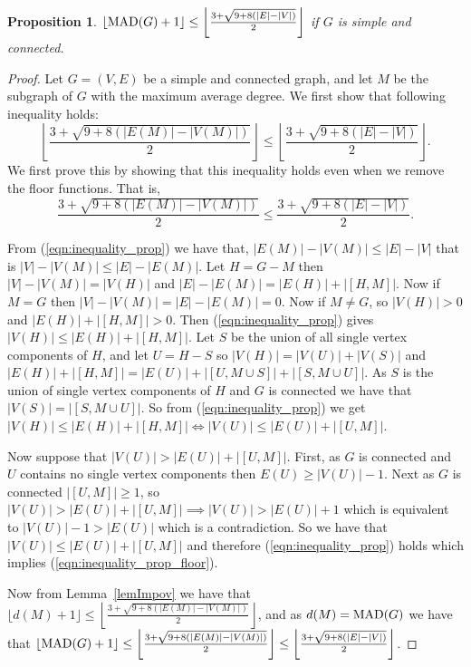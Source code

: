 \documentclass{article}
\newcommand{\MAD}{\ensuremath{\text{\textit{MAD}}}}
\newtheorem{proposition}{Proposition}
\begin{document}
\begin{proposition}\label{improv3}
    $\lfloor \MAD(G)+1 \rfloor \leq \left\lfloor \frac{3+\sqrt{9+8(|E|-|V|)}}{2} \right\rfloor$ if $G$ is simple and connected.
\end{proposition}

\begin{proof}
    Let $G = (V,E)$ be a simple and connected graph, and let $M$ be the subgraph of $G$ with the maximum average degree.
    We first show that following inequality holds:
    \begin{equation}\label{eqn:inequality_prop_floor}
        \left\lfloor \frac{3+\sqrt{9+8(|E(M)|-|V(M)|)}}{2} \right\rfloor \leq \left\lfloor \frac{3+\sqrt{9+8(|E|-|V|)}}{2} \right\rfloor.
    \end{equation}
    We first prove this by showing that this inequality holds even when we remove the floor functions. That is, 
    \begin{equation}\label{eqn:inequality_prop}
    \frac{3+\sqrt{9+8(|E(M)|-|V(M)|)}}{2} \leq \frac{3+\sqrt{9+8(|E|-|V|)}}{2}.
    \end{equation}
    
    From (\ref{eqn:inequality_prop}) we have that, $|E(M)|-|V(M)| \leq |E|-|V|$ that is $|V|-|V(M)| \leq |E|-|E(M)|$. 
    Let $H = G-M$ then $|V|-|V(M)| = |V(H)|$ and $|E|-|E(M)| = |E(H)| + |[H,M]|$. Now if $M = G$ then $|V|-|V(M)| = |E|-|E(M)| = 0$. Now if $M \neq G$, so $|V(H)| > 0$ and  $|E(H)| + |[H,M]| > 0$. Then (\ref{eqn:inequality_prop}) gives $|V(H)| \leq |E(H)| + |[H,M]|$. Let $S$ be the union of all single vertex components of $H$, and let $U = H - S$ so $|V(H)| = |V(U)| + |V(S)|$ and $|E(H)| + |[H,M]| = |E(U)| + |[U,M \cup S]| + |[S,M \cup U]|$. As $S$ is the union of single vertex components of $H$ and $G$ is connected we have that $|V(S)| = |[S,M \cup U]|$.
    So from (\ref{eqn:inequality_prop}) we get $|V(H)| \leq |E(H)| + |[H,M]| \iff |V(U)| \leq |E(U)| + |[U,M]|$.

    Now suppose that $|V(U)| > |E(U)| + |[U,M]|$. First, as $G$ is connected and $U$ contains no single vertex components then $E(U) \geq |V(U)| - 1$. Next as $G$ is connected $|[U,M]| \geq 1$, so $|V(U)| > |E(U)| + |[U,M]| \implies |V(U)| > |E(U)| + 1$ which is equivalent to $|V(U)| - 1 > |E(U)|$ which is a contradiction.  So we have that $|V(U)| \leq |E(U)| + |[U,M]|$ and therefore (\ref{eqn:inequality_prop}) holds which implies (\ref{eqn:inequality_prop_floor}).
    
    Now from Lemma~\ref*{lemImpov} we have that $\lfloor d(M)+1 \rfloor \leq \left\lfloor \frac{3+\sqrt{9+8(|E(M)|-|V(M)|)}}{2} \right\rfloor$, and as $d(M) = \MAD(G)$ we have that $\lfloor \MAD(G)+1 \rfloor \leq \left\lfloor \frac{3+\sqrt{9+8(|E(M)|-|V(M)|)}}{2} \right\rfloor \leq \left\lfloor \frac{3+\sqrt{9+8(|E|-|V|)}}{2} \right\rfloor$.
\end{proof}
\end{document}
